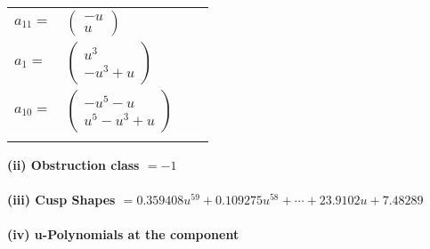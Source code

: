 \documentclass[1p]{elsarticle_modified}
\theoremstyle{definition}
\begin{document}
\begin{tabular}{m{7pt} m{180pt} m{7pt} m{180pt} }
\flushright $a_{11}=$&$\begin{pmatrix}- u\\u\end{pmatrix}$ \\
\flushright $a_{1}=$&$\begin{pmatrix}u^3\\- u^3+u\end{pmatrix}$ \\
\flushright $a_{10}=$&$\begin{pmatrix}- u^5- u\\u^5- u^3+u\end{pmatrix}$\\&\end{tabular}
\flushleft \textbf{(ii) Obstruction class $= -1$}\\~\\
\flushleft \textbf{(iii) Cusp Shapes $= 0.359408 u^{59}+0.109275 u^{58}+\cdots+23.9102 u+7.48289$}\\~\\
\newpage\renewcommand{\arraystretch}{1}
\flushleft \textbf{(iv) u-Polynomials at the component}\newline \\
\end{document}
